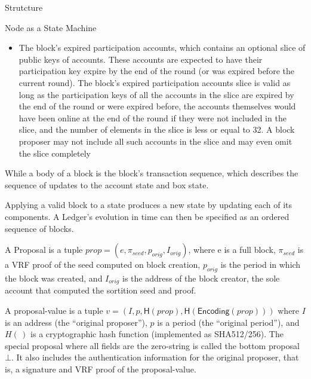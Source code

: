 \documentclass[10pt,a4paper]{article}
\begin{document}
\begin{section}{Strutcture}
\begin{subsection}{Node as a State Machine}
\begin{itemize}
    \item
    The block's expired participation accounts, which contains an optional slice
    of public keys of accounts. These accounts are expected to have their
    participation key expire by the end of the round (or was expired before
    the current round).
    The block's expired participation accounts slice is valid as long as the participation keys 
    of all the accounts in the slice are expired by the end of the round or
    were expired before, the accounts themselves would have been online at the end
    of the round if they were not included in the slice, and the number of elements
    in the slice is less or equal to 32. A block proposer may not include all such
    accounts in the slice and may even omit the slice completely
\end{itemize}
While a body of a block is the block's transaction sequence, which describes the sequence
of updates to the account state and box state. %
%


Applying a valid block to a state produces a new state by updating each of its components.
A Ledger's evolution in time can then be specified as an ordered sequence of blocks.

A Proposal is a tuple $prop = (e, \pi_{seed}, p_{orig}, I_{orig})$, where
e is a full block, $\pi_{seed}$ is a VRF proof of the seed computed
on block creation, $p_{orig}$ is the period in which the block was created,
and $I_{orig}$ is the address of the block creator, the sole account that
computed the sortition seed and proof.

A proposal-value is a tuple $v = (I, p, \mathsf{H}(prop), \mathsf{H}(\mathsf{Encoding}(prop)))$ where 
$I$ is an address (the ``original proposer''), 
$p$ is a period (the ``original period''), 
and
$H(\,)$ is a cryptographic hash function (implemented as SHA512/256). 
The special proposal where all fields are the zero-string is called the bottom 
proposal $\bot$. 
It also includes the authentication information for the original proposer, that is, 
a signature and VRF proof of the proposal-value.


\end{subsection}
\end{section}
\end{document}
